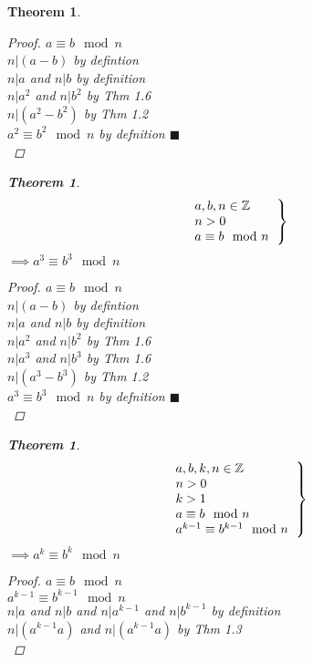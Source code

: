 \documentclass{article}
\newtheorem{theorem}[section]{Theorem}
\begin{document}
\begin{theorem}
\begin{proof}
	$a \equiv b \mod{n}$\\
	$n|(a-b)$ by defintion\\
	$n|a$ and $n|b$ by definition\\
	$n|a^2$ and $n|b^2$ by Thm 1.6\\
	$n|(a^2 - b^2)$ by Thm 1.2\\
	$a^2 \equiv b^2 \mod{n}$ by defnition $\blacksquare$\\
\end{proof}\begin{theorem}%
		\[\left .
		\begin{tabular}{l}
			$a,b,n \in \mathbb{Z}$\\
			$n > 0$\\
			$a \equiv b \mod{n}$\\
		\end{tabular}
	\right \}\]
	$\implies a^3 \equiv b^3 \mod{n}$\\
	\end{theorem}\begin{proof}
	$a \equiv b \mod{n}$\\
	$n|(a-b)$ by defintion\\
	$n|a$ and $n|b$ by definition\\
	$n|a^2$ and $n|b^2$ by Thm 1.6\\
	$n|a^3$ and $n|b^3$ by Thm 1.6\\
	$n|(a^3 - b^3)$ by Thm 1.2\\
	$a^3 \equiv b^3 \mod{n}$ by defnition $\blacksquare$\\
\end{proof}\begin{theorem}%
		\[\left .
		\begin{tabular}{l}
			$a,b,k,n \in \mathbb{Z}$\\
			$n > 0$\\
			$k > 1$\\
			$a \equiv b \mod{n}$\\
			$a^{k-1} \equiv b^{k-1} \mod{n}$\\
		\end{tabular}
	\right \}\]
	$\implies a^k \equiv b^k \mod{n}$\\
	\end{theorem}\begin{proof}
	$a \equiv b \mod{n}$\\
	$a^{k-1} \equiv b^{k-1} \mod{n}$\\
	$n|a$ and $n|b$ and $n|a^{k-1}$ and $n|b^{k-1}$ by definition\\
	$n|(a^{k-1}a)$ and $n|(a^{k-1}a)$ by Thm 1.3\\

\end{proof}
\end{theorem}
\end{document}
